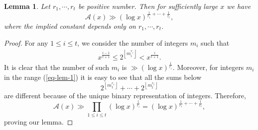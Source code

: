 \documentclass[12pt,a4paper,reqno]{amsart}
\numberwithin{equation}{section}
\theoremstyle{plain}
\newtheorem{lemma}{Lemma}
\theoremstyle{definition}
\begin{document}
\begin{lemma}\label{lem1}
Let $r_1,\cdots, r_t$ be positive number. Then for sufficiently large $x$ we have
$$
\mathcal{A}(x)\gg (\log x)^{\frac{1}{r_1}+\cdots+\frac{1}{r_t}},
$$
where the implied constant depends only on $r_1,\cdots, r_t$.
\end{lemma}
\begin{proof}
For any $1\le i\le t$, we consider the number of integers $m_i$ such that
\begin{align}\label{eq-lem-1}
x^{\frac{i-1}{t+1}}\le 2^{\left\lfloor m_i^{r_i}\right\rfloor}< x^{\frac{i}{t+1}}.
\end{align}
It is clear that the number of such $m_i$ is 
$
\gg (\log x)^{\frac{1}{r_i}}.
$
Moreover, for integers $m_i$ in the range (\ref{eq-lem-1}) it is easy to see that all the sums below
$$
2^{\left\lfloor m_1^{r_1}\right\rfloor}+\cdots+2^{\left\lfloor m_t^{r_t}\right\rfloor}
$$
are different because of the unique binary representation of integers. Therefore,
$$
\mathcal{A}(x)\gg \prod_{1\le i\le t}(\log x)^{\frac{1}{r_i}}=(\log x)^{\frac{1}{r_1}+\cdots+\frac{1}{r_t}},
$$
proving our lemma.
\end{proof}
\end{document}

